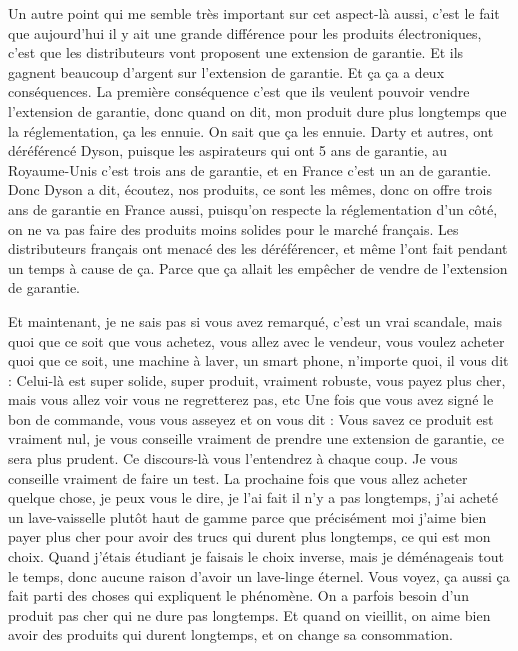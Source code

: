 \begin{small}
Un autre point qui me semble très important sur cet aspect-là aussi, c'est le fait que aujourd'hui il y ait une grande différence pour les produits électroniques, c'est que les distributeurs vont proposent une extension de garantie. Et ils gagnent beaucoup d'argent sur l'extension de garantie. Et ça ça a deux conséquences. La première conséquence c'est que ils veulent pouvoir vendre l'extension de garantie, donc quand on dit, mon produit dure plus longtemps que la réglementation, ça les ennuie. On sait que ça les ennuie. Darty et autres, ont déréférencé Dyson, puisque les aspirateurs qui ont 5 ans de garantie, au Royaume-Unis c'est trois ans de garantie, et en France c'est un an de garantie. Donc Dyson a dit, écoutez, nos produits, ce sont les mêmes, donc on offre trois ans de garantie en France aussi, puisqu'on respecte la réglementation d'un côté, on ne va pas faire des produits moins solides pour le marché français. Les distributeurs français ont menacé des les déréférencer, et même l'ont fait pendant un temps à cause de ça. Parce que ça allait les empêcher de vendre de l'extension de garantie. 

Et maintenant, je ne sais pas si vous avez remarqué, c'est un vrai scandale, mais quoi que ce soit que vous achetez, vous allez avec le vendeur, vous voulez acheter quoi que ce soit, une machine à laver, un smart phone, n'importe quoi, il vous dit : \og Celui-là est super solide, super produit, vraiment robuste, vous payez plus cher, mais vous allez voir vous ne regretterez pas, etc\fg{} Une fois que vous avez signé le bon de commande, vous vous asseyez et on vous dit : \og Vous savez ce produit est vraiment nul, je vous conseille vraiment de prendre une extension de garantie, ce sera plus prudent\fg{}. Ce discours-là vous l'entendrez à chaque coup. Je vous conseille vraiment de faire un test. La prochaine fois que vous allez acheter quelque chose, je peux vous le dire, je l'ai fait il n'y a pas longtemps, j'ai acheté un lave-vaisselle plutôt haut de gamme parce que précisément moi j'aime bien payer plus cher pour avoir des trucs qui durent plus longtemps, ce qui est mon choix. Quand j'étais étudiant je faisais le choix inverse, mais je déménageais tout le temps, donc aucune raison d'avoir un lave-linge éternel. Vous voyez, ça aussi ça fait parti des choses qui expliquent le phénomène. On a parfois besoin d'un produit pas cher qui ne dure pas longtemps. Et quand on vieillit, on aime bien avoir des produits qui durent longtemps, et on change sa consommation. 


\end{small}
